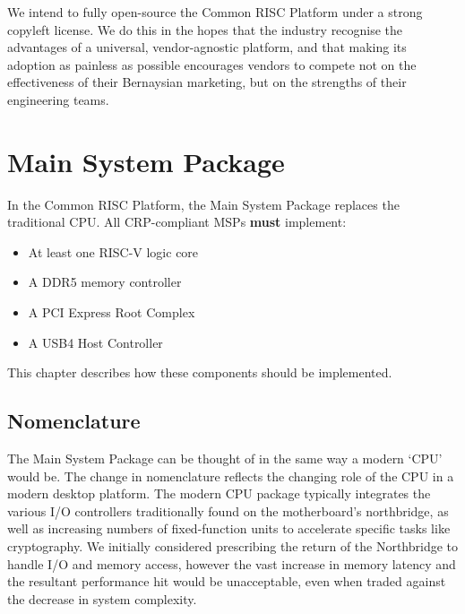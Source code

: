 \documentclass[12pt]{report}
\begin{document}
We intend to fully open-source the Common RISC Platform under a strong copyleft license. We do this in the hopes
that the industry recognise the advantages of a universal, vendor-agnostic platform, and that making its adoption as
painless as possible encourages vendors to compete not on the effectiveness of their Bernaysian marketing, but on
the strengths of their engineering teams.

\newpage

\chapter{Main System Package}
\large
In the Common RISC Platform, the Main System Package replaces the traditional CPU. All CRP-compliant MSPs \textbf{must}
implement:
\begin{itemize}
	\item At least one RISC-V logic core
	\item A DDR5 memory controller
	\item A PCI Express Root Complex
	\item A USB4 Host Controller
\end{itemize}
This chapter describes how these components should be implemented.
\normalsize
\newpage

\section{Nomenclature}
The Main System Package can be thought of in the same way a modern `CPU' would be. The change in nomenclature reflects the
changing role of the CPU in a modern desktop platform. The modern CPU package typically integrates the various I/O controllers
traditionally found on the motherboard's northbridge, as well as increasing numbers of fixed-function units to accelerate
specific tasks like cryptography. We initially considered prescribing the return of the Northbridge to handle I/O and memory
access, however the vast increase in memory latency and the resultant performance hit would be unacceptable, even when
traded against the decrease in system complexity.
\end{document}
